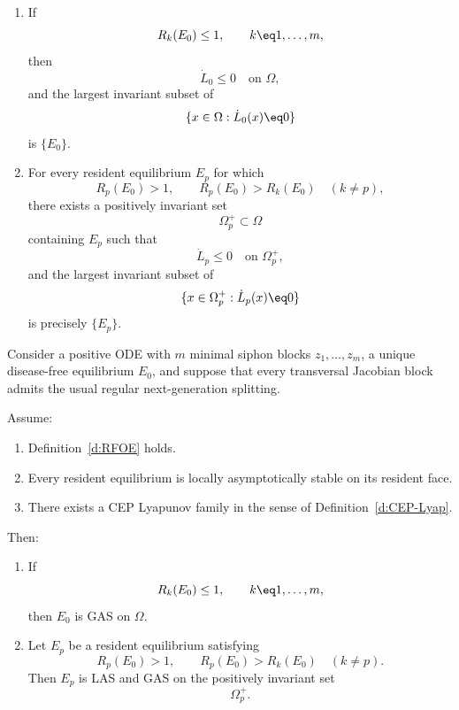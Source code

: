 \begin{enumerate}

\item[(i)]
If
\[
R_k(E_0)\le1,
\qquad
k\eq1,\ldots,m,
\]
then
\[
\dot L_0\le0
\quad\text{on }\Omega,
\]
and the largest invariant subset of
\[
\{x\in\Omega:\dot L_0(x)\eq0\}
\]
is $\{E_0\}$.

\item[(ii)]
For every resident equilibrium $E_p$ for which
\[
R_p(E_0)>1,
\qquad
R_p(E_0)>R_k(E_0)
\quad(k\ne p),
\]
there exists a positively invariant set
\[
\Omega_p^+\subset\Omega
\]
containing $E_p$ such that
\[
\dot L_p\le0
\quad\text{on }\Omega_p^+,
\]
and the largest invariant subset of
\[
\{x\in\Omega_p^+:\dot L_p(x)\eq0\}
\]
is precisely $\{E_p\}$.

\end{enumerate}

\eeD


Consider a positive ODE with $m$ minimal siphon blocks
$z_1,\ldots,z_m$, a unique disease-free equilibrium $E_0$, and suppose
that every transversal Jacobian block admits the usual regular
next-generation splitting.

Assume:

\begin{enumerate}

\item[(RFOE)]
Definition~\ref{d:RFOE} holds.

\item[(TLS)]
Every resident equilibrium is locally asymptotically stable on its
resident face.

\item[(LY)]
There exists a CEP Lyapunov family in the sense of
Definition~\ref{d:CEP-Lyap}.

\end{enumerate}

Then:

\begin{enumerate}

\item
If
\[
R_k(E_0)\le1,
\qquad
k\eq1,\ldots,m,
\]
then $E_0$ is GAS on $\Omega$.

\item
Let $E_p$ be a resident equilibrium satisfying
\[
R_p(E_0)>1,
\qquad
R_p(E_0)>R_k(E_0)
\quad(k\ne p).
\]
Then $E_p$ is LAS and GAS on the positively invariant set
\[
\Omega_p^+.
\]

\end{enumerate}

